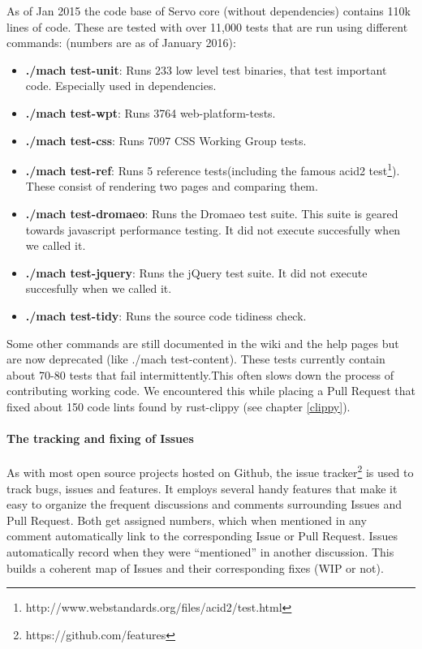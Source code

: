 \documentclass{scrartcl}
\begin{document}
As of Jan 2015 the code base of Servo core (without dependencies) contains 110k lines of code. These are tested with over 11,000 tests that are run using different commands: (numbers are as of January 2016):
\begin{itemize}
    \item \textbf{./mach test-unit}: Runs 233 low level test binaries, that test important code. Especially used in dependencies.
    \item \textbf{./mach test-wpt}: Runs 3764 web-platform-tests. 
    \item \textbf{./mach test-css}: Runs 7097 CSS Working Group tests.
    \item \textbf{./mach test-ref}: Runs 5 reference tests(including the famous acid2 test\footnote{http://www.webstandards.org/files/acid2/test.html}). These consist of rendering two pages and comparing them.
    \item \textbf{./mach test-dromaeo}: Runs the Dromaeo test suite. This suite is geared towards javascript performance testing. It did not execute succesfully when we called it.
    \item \textbf{./mach test-jquery}: Runs the jQuery test suite. It did not execute succesfully when we called it.
    \item \textbf{./mach test-tidy}: Runs the source code tidiness check.
\end{itemize}

Some other commands are still documented in the wiki and the help pages but are now deprecated (like ./mach test-content). These tests currently contain about 70-80 tests that fail intermittently.This often slows down the process of contributing working code. We encountered this while placing a Pull Request that fixed about 150 code lints found by rust-clippy (see chapter \ref{clippy}).

\paragraph{The tracking and fixing of Issues}
As with most open source projects hosted on Github, the issue tracker\footnote{https://github.com/features} is used to track bugs, issues and features. It employs several handy features that make it easy to organize the frequent discussions and comments surrounding Issues and Pull Request. Both get assigned numbers, which when mentioned in any comment automatically link to the corresponding Issue or Pull Request. Issues automatically record when they were ``mentioned'' in another discussion. This builds a coherent map of Issues and their corresponding fixes (WIP or not).
\end{document}
